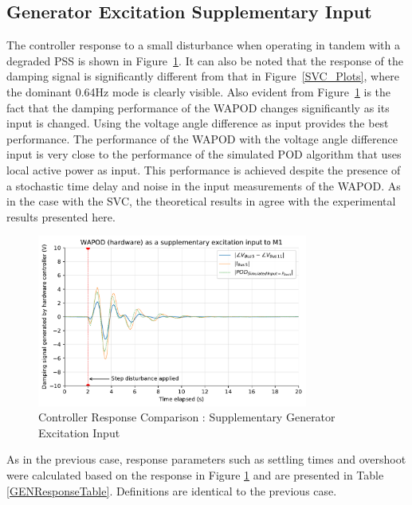 \documentclass[journal]{IEEEtran}
\begin{document}
\subsection{Generator Excitation Supplementary Input}
The controller response to a small disturbance when operating in tandem with a degraded PSS is shown in Figure~\ref{Generator_Plots}. It can also be noted that the response of the damping signal is significantly different from that in Figure~\ref{SVC_Plots}, where the dominant 0.64Hz mode is clearly visible. Also evident from Figure~\ref{Generator_Plots} is the fact that the damping performance of the WAPOD changes significantly as its input is changed. Using the voltage angle difference as input provides the best performance. The performance of the WAPOD with the voltage angle difference input is very close to the performance of the simulated POD algorithm that uses local active power as input. This performance is achieved despite the presence of a stochastic time delay and noise in the input measurements of the WAPOD. As in the case with the SVC, the theoretical results in \cite{Yuwa} agree with the experimental results presented here.

\begin{figure}[thpb]
\centering
\includegraphics[width=3.5in]{Controller_Response_Generator_input.pdf}
\caption{Controller Response Comparison : Supplementary Generator Excitation Input}
\label{Generator_Plots}
\vspace{-1em}
\end{figure}

As in the previous case, response parameters such as settling times and overshoot were calculated based on the response in Figure \ref{Generator_Plots} and are presented in Table \ref{GENResponseTable}. Definitions are identical to the previous case.\\
\end{document}

